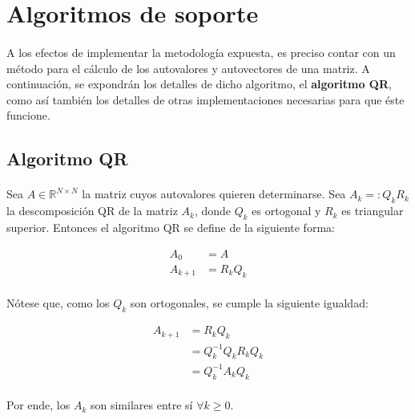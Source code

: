 \documentclass[12pt, twocolumn]{article}
\begin{document}
	
	\section{Algoritmos de soporte}
	
	\paragraph{} A los efectos de implementar la metodología expuesta, es preciso contar con un método para el cálculo de los autovalores y autovectores de una matriz. A continuación, se expondrán los detalles de dicho algoritmo, el \textbf{algoritmo QR}, como así también los detalles de otras implementaciones necesarias para que éste funcione.
	
	\subsection{Algoritmo QR}
	
	\paragraph{} Sea $A \in \mathbb{R}^{N \times N}$ la matriz cuyos autovalores quieren determinarse. Sea $A_{k}=:Q_{k}R_{k}$ la descomposición QR de la matriz $A_{k}$, donde $Q_{k}$ es ortogonal y $R_{k}$ es triangular superior. Entonces el algoritmo QR se define de la siguiente forma:
	
	\begin{align}
		A_{0} &= A \\
		A_{k+1} &= R_{k}Q_{k}
	\end{align}
	
	\paragraph{} Nótese que, como los $Q_{k}$ son ortogonales, se cumple la siguiente igualdad:
	
	\begin{align}
		A_{k+1} &= R_{k}Q_{k}  \\ &= Q^{-1}_{k}Q_{k}R_{k}Q_{k} \\ &= Q^{-1}_{k}A_{k}Q_{k}
	\end{align}
	
	\paragraph{} Por ende, los $A_{k}$ son similares entre sí $\forall k\ge0$.
	
\end{document}
